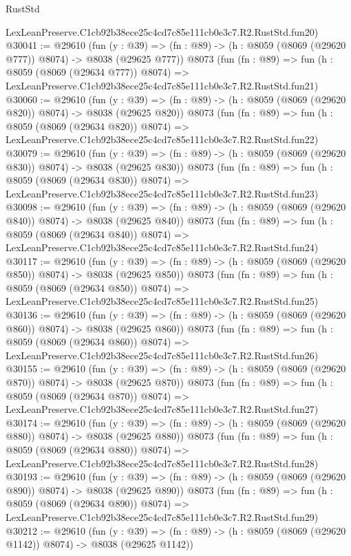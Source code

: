 \begin{lexlean}{RustStd}
\begin{coremodule}
    LexLeanPreserve.C1cb92b38ece25c4cd7c85e111cb0e3c7.R2.RustStd.fun20)
@30041 := @29610
    (fun (y : @39) => (fn : @89) -> (h : @8059 (@8069 (@29620 @777)) @8074) -> @8038 (@29625 @777))
    @8073
    (fun (fn : @89) =>
    fun (h : @8059 (@8069 (@29634 @777)) @8074) =>
    LexLeanPreserve.C1cb92b38ece25c4cd7c85e111cb0e3c7.R2.RustStd.fun21)
@30060 := @29610
    (fun (y : @39) => (fn : @89) -> (h : @8059 (@8069 (@29620 @820)) @8074) -> @8038 (@29625 @820))
    @8073
    (fun (fn : @89) =>
    fun (h : @8059 (@8069 (@29634 @820)) @8074) =>
    LexLeanPreserve.C1cb92b38ece25c4cd7c85e111cb0e3c7.R2.RustStd.fun22)
@30079 := @29610
    (fun (y : @39) => (fn : @89) -> (h : @8059 (@8069 (@29620 @830)) @8074) -> @8038 (@29625 @830))
    @8073
    (fun (fn : @89) =>
    fun (h : @8059 (@8069 (@29634 @830)) @8074) =>
    LexLeanPreserve.C1cb92b38ece25c4cd7c85e111cb0e3c7.R2.RustStd.fun23)
@30098 := @29610
    (fun (y : @39) => (fn : @89) -> (h : @8059 (@8069 (@29620 @840)) @8074) -> @8038 (@29625 @840))
    @8073
    (fun (fn : @89) =>
    fun (h : @8059 (@8069 (@29634 @840)) @8074) =>
    LexLeanPreserve.C1cb92b38ece25c4cd7c85e111cb0e3c7.R2.RustStd.fun24)
@30117 := @29610
    (fun (y : @39) => (fn : @89) -> (h : @8059 (@8069 (@29620 @850)) @8074) -> @8038 (@29625 @850))
    @8073
    (fun (fn : @89) =>
    fun (h : @8059 (@8069 (@29634 @850)) @8074) =>
    LexLeanPreserve.C1cb92b38ece25c4cd7c85e111cb0e3c7.R2.RustStd.fun25)
@30136 := @29610
    (fun (y : @39) => (fn : @89) -> (h : @8059 (@8069 (@29620 @860)) @8074) -> @8038 (@29625 @860))
    @8073
    (fun (fn : @89) =>
    fun (h : @8059 (@8069 (@29634 @860)) @8074) =>
    LexLeanPreserve.C1cb92b38ece25c4cd7c85e111cb0e3c7.R2.RustStd.fun26)
@30155 := @29610
    (fun (y : @39) => (fn : @89) -> (h : @8059 (@8069 (@29620 @870)) @8074) -> @8038 (@29625 @870))
    @8073
    (fun (fn : @89) =>
    fun (h : @8059 (@8069 (@29634 @870)) @8074) =>
    LexLeanPreserve.C1cb92b38ece25c4cd7c85e111cb0e3c7.R2.RustStd.fun27)
@30174 := @29610
    (fun (y : @39) => (fn : @89) -> (h : @8059 (@8069 (@29620 @880)) @8074) -> @8038 (@29625 @880))
    @8073
    (fun (fn : @89) =>
    fun (h : @8059 (@8069 (@29634 @880)) @8074) =>
    LexLeanPreserve.C1cb92b38ece25c4cd7c85e111cb0e3c7.R2.RustStd.fun28)
@30193 := @29610
    (fun (y : @39) => (fn : @89) -> (h : @8059 (@8069 (@29620 @890)) @8074) -> @8038 (@29625 @890))
    @8073
    (fun (fn : @89) =>
    fun (h : @8059 (@8069 (@29634 @890)) @8074) =>
    LexLeanPreserve.C1cb92b38ece25c4cd7c85e111cb0e3c7.R2.RustStd.fun29)
@30212 := @29610
    (fun (y : @39) =>
    (fn : @89) -> (h : @8059 (@8069 (@29620 @1142)) @8074) -> @8038 (@29625 @1142))

\end{coremodule}
\end{lexlean}
